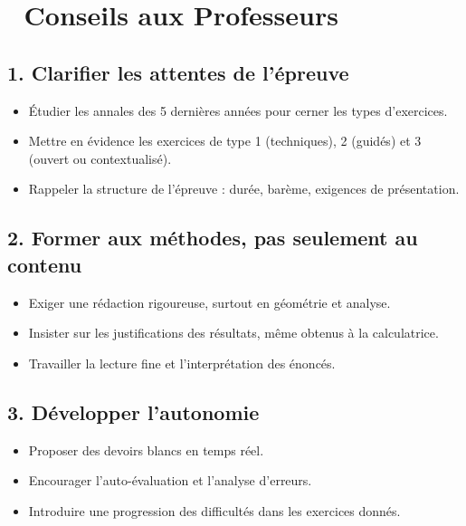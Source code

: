 








\section*{🔵 Conseils aux Professeurs}

\subsection*{1. Clarifier les attentes de l’épreuve}
\begin{itemize}[label=--]
    \item Étudier les annales des 5 dernières années pour cerner les types d’exercices.
    \item Mettre en évidence les exercices de type 1 (techniques), 2 (guidés) et 3 (ouvert ou contextualisé).
    \item Rappeler la structure de l’épreuve : durée, barème, exigences de présentation.
\end{itemize}

\subsection*{2. Former aux méthodes, pas seulement au contenu}
\begin{itemize}[label=--]
    \item Exiger une rédaction rigoureuse, surtout en géométrie et analyse.
    \item Insister sur les justifications des résultats, même obtenus à la calculatrice.
    \item Travailler la lecture fine et l’interprétation des énoncés.
\end{itemize}

\subsection*{3. Développer l’autonomie}
\begin{itemize}[label=--]
    \item Proposer des devoirs blancs en temps réel.
    \item Encourager l’auto-évaluation et l’analyse d’erreurs.
    \item Introduire une progression des difficultés dans les exercices donnés.
\end{itemize}

